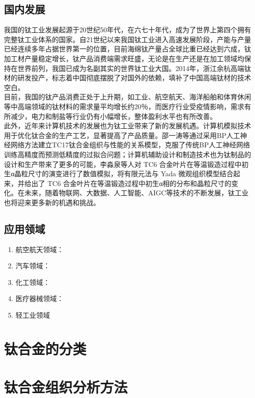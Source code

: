 \documentclass[
class = book,
zihao = -4,
font = noto,
paper = a4paper,
openany
]{easybook}
\begin{document}
	\subsection{国内发展}
	我国的钛工业发展起源于20世纪50年代，在六七十年代，成为了世界上第四个拥有完整钛工业体系的国家。自21世纪以来我国钛工业进入高速发展阶段，产能与产量已经连续多年占据世界第一的位置，目前海绵钛产量占全球比重已经达到六成，钛加工材产量稳定增长，钛产品消费端需求旺盛，无论是在生产还是在加工领域均保持在世界前列，我国已成为名副其实的世界钛工业大国。2014年，浙江余杭高端钛材的研发投产，标志着中国彻底摆脱了对国外的依赖，填补了中国高端钛材的技术空白。\cite{TGYJ200405004}\\


	目前，我国的钛产品消费正处于上升期，如工业、航空航天、海洋船舶和体育休闲等中高端领域的钛材料的需求量平均增长约20％，而医疗行业受疫情影响，需求有所减少，电力和制盐等行业仍有小幅增长，整体盈利水平也有所改善。\\


	此外，近年来计算机技术的发展也为钛工业带来了新的发展机遇。计算机模拟技术用于优化钛合金的生产工艺，显著提高了产品质量。邵一涛等通过采用BP人工神经网络方法建立TC17钛合金组织与性能的关系模型，克服了传统BP人工神经网络训练高精度而预测低精度的过拟合问题；计算机辅助设计和制造技术也为钛制品的设计和生产带来了更多的可能，李淼泉等人对 TC6 合金叶片在等温锻造过程中初生α晶粒尺寸的演变进行了数值模拟，将有限元法与 Yada 微观组织模型结合起来，并给出了 TC6 合金叶片在等温锻造过程中初生α相的分布和晶粒尺寸的变化。在未来，随着物联网、大数据、人工智能、AIGC等技术的不断发展，钛工业也将迎来更多新的机遇和挑战。\\

	\subsection{应用领域}
	\begin{enumerate}
		\item  航空航天领域：
		\item  汽车领域：
		\item  化工领域：
		\item  医疗器械领域：
		\item  轻工业领域
	\end{enumerate}


	\section{钛合金的分类}
	\section{钛合金组织分析方法}
\end{document}
